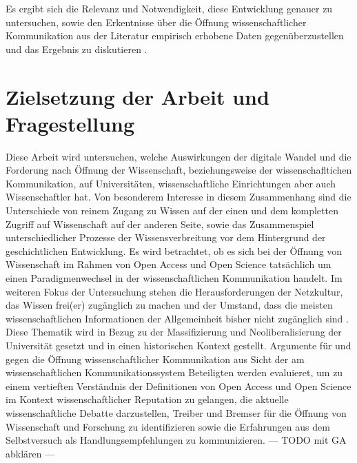 Es ergibt sich die Relevanz und Notwendigkeit, diese Entwicklung genauer zu untersuchen, sowie den Erkentnisse über die Öffnung wissenschaftlicher Kommunikation aus der Literatur empirisch erhobene Daten gegenüberzustellen und das Ergebnis zu diskutieren .

\section{Zielsetzung der Arbeit und Fragestellung} 

Diese Arbeit wird untersuchen, welche Auswirkungen der digitale Wandel und die Forderung nach Öffnung der Wissenschaft, beziehungsweise der wissenschafltichen Kommunikation, auf Universitäten, wissenschaftliche Einrichtungen aber auch Wissenschaftler hat. Von besonderem Interesse in diesem Zusammenhang sind die Unterschiede von reinem Zugang zu Wissen auf der einen und dem kompletten Zugriff auf Wissenschaft auf der anderen Seite, sowie das Zusammenspiel unterschiedlicher Prozesse der Wissensverbreitung vor dem Hintergrund der geschichtlichen Entwicklung. Es wird betrachtet, ob es sich bei der Öffnung von Wissenschaft im Rahmen von Open Access und Open Science tatsächlich um einen Paradigmenwechsel in der wissenschaftlichen Kommunikation handelt. Im weiteren Fokus der Untersuchung stehen die Herausforderungen der Netzkultur, das Wissen frei(er) zugänglich zu machen und der Umstand, dass die meisten wissenschaftlichen Informationen der Allgemeinheit bisher nicht zugänglich sind \cite{cite:6}. Diese Thematik wird in Bezug zu der Massifizierung und Neoliberalisierung der Universität gesetzt und in einen historischen Kontext gestellt. Argumente für und gegen die Öffnung wissenschaftlicher Kommunikation aus Sicht der am wissenschaftlichen Kommunikationssystem Beteiligten werden evaluieret, um zu einem vertieften Verständnis der Definitionen von Open Access und Open Science im Kontext wissenschaftlicher Reputation zu gelangen, die aktuelle wissenschaftliche Debatte darzustellen, Treiber und Bremser für die Öffnung von Wissenschaft und Forschung zu identifizieren sowie die Erfahrungen aus dem Selbstversuch als Handlungsempfehlungen zu kommunizieren. --- TODO mit GA abklären --- 

